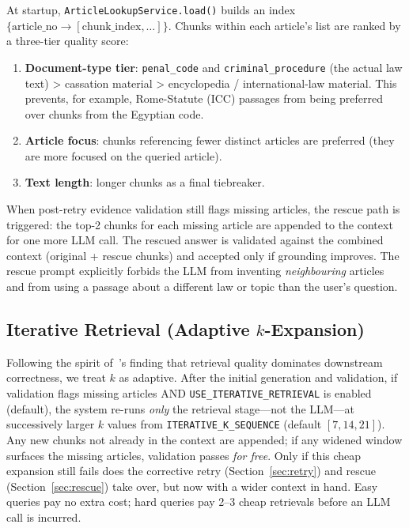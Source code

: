 \documentclass[final,1p,times]{elsarticle}
\begin{document}
At startup, \texttt{ArticleLookupService.load()} builds an index
$\{\text{article\_no} \rightarrow [\text{chunk\_index},\ldots]\}$. Chunks
within each article's list are ranked by a three-tier quality score:
\begin{enumerate}
  \item \textbf{Document-type tier}: \texttt{penal\_code} and
        \texttt{criminal\_procedure} (the actual law text) > cassation
        material > encyclopedia / international-law material. This prevents,
        for example, Rome-Statute (ICC) passages from being preferred over
        chunks from the Egyptian code.
  \item \textbf{Article focus}: chunks referencing fewer distinct articles
        are preferred (they are more focused on the queried article).
  \item \textbf{Text length}: longer chunks as a final tiebreaker.
\end{enumerate}

When post-retry evidence validation still flags missing articles, the rescue
path is triggered: the top-2 chunks for each missing article are appended to
the context for one more LLM call. The rescued answer is validated against
the combined context (original + rescue chunks) and accepted only if
grounding improves. The rescue prompt explicitly forbids the LLM from
inventing \emph{neighbouring} articles and from using a passage about a
different law or topic than the user's question.

\subsection{Iterative Retrieval (Adaptive $k$-Expansion)}\label{sec:iter}

Following the spirit of~\cite{alghamdi2023}'s finding that retrieval quality
dominates downstream correctness, we treat $k$ as adaptive. After the initial
generation and validation, if validation flags missing articles AND
\texttt{USE\_ITERATIVE\_RETRIEVAL} is enabled (default), the system re-runs
\emph{only} the retrieval stage---not the LLM---at successively larger $k$
values from \texttt{ITERATIVE\_K\_SEQUENCE} (default $[7,14,21]$). Any new
chunks not already in the context are appended; if any widened window
surfaces the missing articles, validation passes \emph{for free}. Only if
this cheap expansion still fails does the corrective retry
(Section~\ref{sec:retry}) and rescue (Section~\ref{sec:rescue}) take over,
but now with a wider context in hand. Easy queries pay no extra cost; hard
queries pay 2--3 cheap retrievals before an LLM call is incurred.
\end{document}
